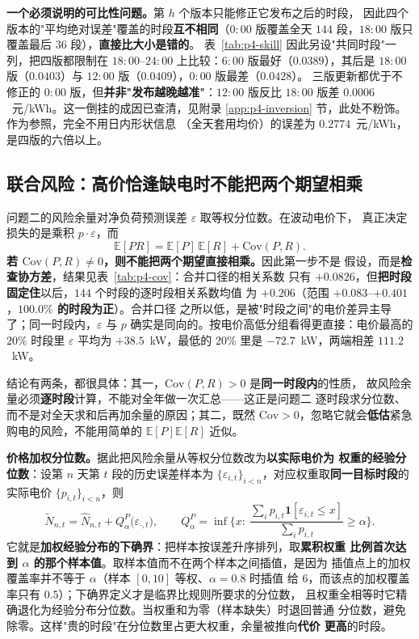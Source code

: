 \textbf{一个必须说明的可比性问题。}第 $h$ 个版本只能修正它发布之后的时段，
因此四个版本的"平均绝对误差"覆盖的时段\textbf{互不相同}（$0{:}00$ 版覆盖全天
$144$ 段，$18{:}00$ 版只覆盖最后 $36$ 段），\textbf{直接比大小是错的}。
表~\ref{tab:p4-skill} 因此另设"共同时段"一列，把四版都限制在
$18{:}00$--$24{:}00$ 上比较：$6{:}00$ 版最好（$0.0389$），其后是 $18{:}00$
版（$0.0403$）与 $12{:}00$ 版（$0.0409$），$0{:}00$ 版最差（$0.0428$）。
三版更新都优于不修正的 $0{:}00$ 版，但\textbf{并非"发布越晚越准"}：$12{:}00$
版反比 $18{:}00$ 版差 $0.0006$~元/kWh。这一倒挂的成因已查清，见附录
\ref{app:p4-inversion} 节，此处不粉饰。作为参照，完全不用日内形状信息
（全天套用均价）的误差为 $0.2774$~元/kWh，是四版的六倍以上。

\subsection{联合风险：高价恰逢缺电时不能把两个期望相乘}
\label{sec:p4-risk}

问题二的风险余量对净负荷预测误差 $\varepsilon$ 取等权分位数。在波动电价下，
真正决定损失的是乘积 $p\cdot\varepsilon$，而
$$
\mathbb{E}[PR]=\mathbb{E}[P]\,\mathbb{E}[R]+\mathrm{Cov}(P,R).
$$
\textbf{若 $\mathrm{Cov}(P,R)\neq0$，则不能把两个期望直接相乘。}因此第一步不是
假设，而是\textbf{检查协方差}，结果见表~\ref{tab:p4-cov}：合并口径的相关系数
只有 $+0.0826$，但\textbf{把时段固定住}以后，$144$ 个时段的逐时段相关系数均值
为 $+0.206$（范围 $+0.083$--$+0.401$，\textbf{$100.0\%$ 的时段为正}）。合并口径
之所以低，是被"时段之间"的电价差异主导了；同一时段内，$\varepsilon$ 与 $p$
确实是同向的。按电价高低分组看得更直接：电价最高的 $20\%$ 时段里
$\varepsilon$ 平均为 $+38.5$~kW，最低的 $20\%$ 里是 $-72.7$~kW，两端相差
$111.2$~kW。

结论有两条，都很具体：其一，$\mathrm{Cov}(P,R)>0$ 是\textbf{同一时段内}的性质，
故风险余量必须\textbf{逐时段}计算，不能对全年做一次汇总——这正是问题二
逐时段求分位数、而不是对全天求和后再加余量的原因；其二，既然
$\mathrm{Cov}>0$，忽略它就会\textbf{低估}紧急购电的风险，不能用简单的
$\mathbb{E}[P]\mathbb{E}[R]$ 近似。

\textbf{价格加权分位数。}据此把风险余量从等权分位数改为\textbf{以实际电价为
权重的经验分位数}：设第 $n$ 天第 $t$ 段的历史误差样本为
$\{\varepsilon_{i,t}\}_{i<n}$，对应权重取\textbf{同一目标时段}的实际电价
$\{p_{i,t}\}_{i<n}$，则
$$
\widetilde N_{n,t}=\widehat N_{n,t}+Q^{P}_{\alpha}\big(\varepsilon_{\cdot,t}\big),
\qquad
Q^{P}_{\alpha}=\inf\Big\{x:\
\frac{\sum_{i}p_{i,t}\mathbf 1[\varepsilon_{i,t}\le x]}{\sum_i p_{i,t}}\ge
\alpha\Big\}.
$$
它就是\textbf{加权经验分布的下确界}：把样本按误差升序排列，取\textbf{累积权重
比例首次达到 $\alpha$ 的那个样本值}。取样本值而不在两个样本之间插值，是因为
插值点上的加权覆盖率并不等于 $\alpha$（样本 $[0,10]$ 等权、$\alpha=0.8$ 时插值
给 $6$，而该点的加权覆盖率只有 $0.5$）；下确界定义才是临界比规则所要求的分位数，
且权重全相等时它精确退化为经验分布分位数。当权重和为零（样本缺失）时退回普通
分位数，避免除零。这样"贵的时段"在分位数里占更大权重，余量被推向\textbf{代价
更高}的时段。

